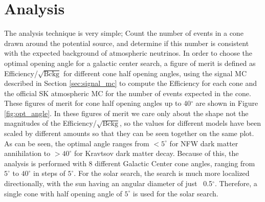 \section{Analysis}
\label{sec:analysis}
The analysis technique is very simple;  Count the number of events in a cone drawn around the potential source, and determine if this number is consistent with the expected background of atmospheric neutrinos.  In order to choose the optimal opening angle for a galactic center search, a figure of merit is defined as Efficiency/$\sqrt{\textrm{Bckg}}$ for different cone half opening angles, using the signal MC described in Section \ref{sec:signal_mc} to compute the Efficiency for each cone and the official  SK atmospheric  MC for the number of events expected in the cone.  These figures of merit for cone half opening angles up to 40$^\circ$ are shown in Figure \ref{fig:opt_angle}.  In these figures of merit we care only about the shape not the magnitudes of the Efficiency/$\sqrt{\textrm{Bckg}}$, so the values for different models have been scaled by different amounts so that they can be seen together on the same plot.  As can be seen, the optimal angle ranges from $<5^\circ$ for NFW dark matter annihilation to $>40^\circ$ for Kravtsov dark matter decay.  Because of this, the analysis is performed with 8 different Galactic Center cone angles, ranging from $5^\circ$ to $40^\circ$ in steps of $5^\circ$.  For the solar search, the search is much more localized directionally, with the sun having an angular diameter of just ~0.5$^\circ$.  Therefore, a single cone with half opening angle of $5^\circ$ is used for the solar search.  


